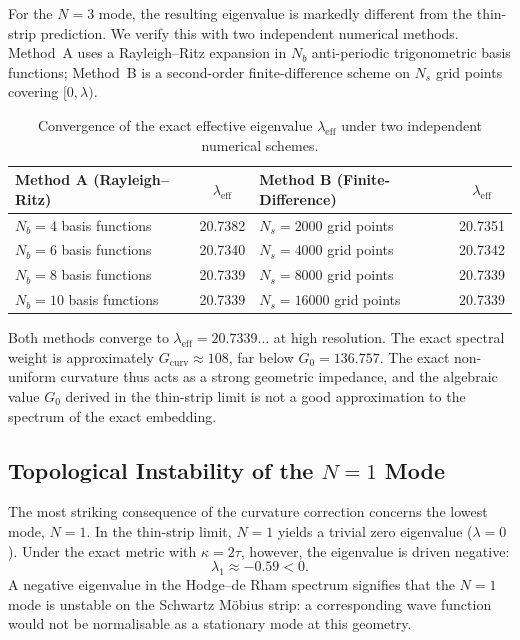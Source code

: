 \documentclass[11pt,a4paper]{article}
\begin{document}
For the $N=3$ mode, the resulting eigenvalue is markedly different from the thin-strip prediction. We verify this with two independent numerical methods. Method~A uses a Rayleigh--Ritz expansion in $N_b$ anti-periodic trigonometric basis functions; Method~B is a second-order finite-difference scheme on $N_s$ grid points covering $[0, \lambda)$.

\begin{table}[h]
\centering
\begin{tabular}{lc | lc}
\hline\hline
\textbf{Method A (Rayleigh--Ritz)} & $\lambda_{\text{eff}}$ & \textbf{Method B (Finite-Difference)} & $\lambda_{\text{eff}}$ \\
\hline
$N_b = 4$ basis functions & 20.7382 & $N_s = 2000$ grid points & 20.7351 \\
$N_b = 6$ basis functions & 20.7340 & $N_s = 4000$ grid points & 20.7342 \\
$N_b = 8$ basis functions & 20.7339 & $N_s = 8000$ grid points & 20.7339 \\
$N_b = 10$ basis functions & 20.7339 & $N_s = 16000$ grid points & 20.7339 \\
\hline\hline
\end{tabular}
\caption{Convergence of the exact effective eigenvalue $\lambda_{\text{eff}}$ under two independent numerical schemes.}
\label{tab:convergence}
\end{table}

Both methods converge to $\lambda_{\text{eff}} = 20.7339\dots$ at high resolution. The exact spectral weight is approximately $G_{\text{curv}} \approx 108$, far below $G_0 = 136.757$. The exact non-uniform curvature thus acts as a strong geometric impedance, and the algebraic value $G_0$ derived in the thin-strip limit is not a good approximation to the spectrum of the exact embedding.

\subsection{Topological Instability of the $N=1$ Mode}
The most striking consequence of the curvature correction concerns the lowest mode, $N=1$. In the thin-strip limit, $N=1$ yields a trivial zero eigenvalue ($\lambda = 0$). Under the exact metric with $\kappa = 2\tau$, however, the eigenvalue is driven negative:
\begin{equation}
\lambda_1 \approx -0.59 < 0.
\end{equation}
A negative eigenvalue in the Hodge--de Rham spectrum signifies that the $N=1$ mode is unstable on the Schwartz M\"obius strip: a corresponding wave function would not be normalisable as a stationary mode at this geometry.
\end{document}
